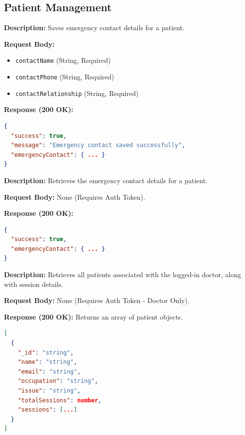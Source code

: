 \documentclass{article}
\begin{document}
\subsection{Patient Management}

\begin{tcolorbox}[title=\textcolor{accent}{POST} /api/patients/emergency-contact]
\textbf{Description:} Saves emergency contact details for a patient.

\vspace{0.5em}
\textbf{Request Body:}
\begin{itemize}
    \item \texttt{contactName} (String, Required)
    \item \texttt{contactPhone} (String, Required)
    \item \texttt{contactRelationship} (String, Required)
\end{itemize}

\vspace{0.5em}
\textbf{Response (200 OK):}
\begin{lstlisting}[language=json]
{
  "success": true,
  "message": "Emergency contact saved successfully",
  "emergencyContact": { ... }
}
\end{lstlisting}
\end{tcolorbox}

\begin{tcolorbox}[title=\textcolor{accent}{GET} /api/patients/emergency-contact]
\textbf{Description:} Retrieves the emergency contact details for a patient.

\vspace{0.5em}
\textbf{Request Body:} None (Requires Auth Token).

\vspace{0.5em}
\textbf{Response (200 OK):}
\begin{lstlisting}[language=json]
{
  "success": true,
  "emergencyContact": { ... }
}
\end{lstlisting}
\end{tcolorbox}

\begin{tcolorbox}[title=\textcolor{accent}{GET} /api/patients/doctor-patients]
\textbf{Description:} Retrieves all patients associated with the logged-in doctor, along with session details.

\vspace{0.5em}
\textbf{Request Body:} None (Requires Auth Token - Doctor Only).

\vspace{0.5em}
\textbf{Response (200 OK):} Returns an array of patient objects.
\begin{lstlisting}[language=json]
[
  {
    "_id": "string",
    "name": "string",
    "email": "string",
    "occupation": "string",
    "issue": "string",
    "totalSessions": number,
    "sessions": [...]
  }
]
\end{lstlisting}
\end{tcolorbox}
\end{document}
